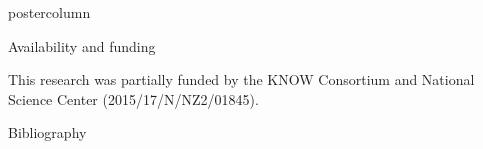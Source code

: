 \documentclass[final]{beamer}\usepackage[]{graphicx}\usepackage[]{color}
\begin{document}
\begin{frame}
\begin{columns}
\begin{column}{.51\textwidth}
\begin{beamercolorbox}[center,wd=\textwidth]{postercolumn}
\begin{minipage}[T]{.95\textwidth}
{\begin{block}{Availability and funding}
\bigskip

\small{This research was partially funded by the KNOW Consortium and National Science Center (2015/17/N/NZ2/01845).}

\end{block}
\vfill

 \begin{block}{Bibliography}
  \tiny{
  
  
  }
  \end{block}
  \vfill  


}
\end{minipage}
\end{beamercolorbox}
\end{column}
\end{columns}  
\end{frame}
\end{document}
